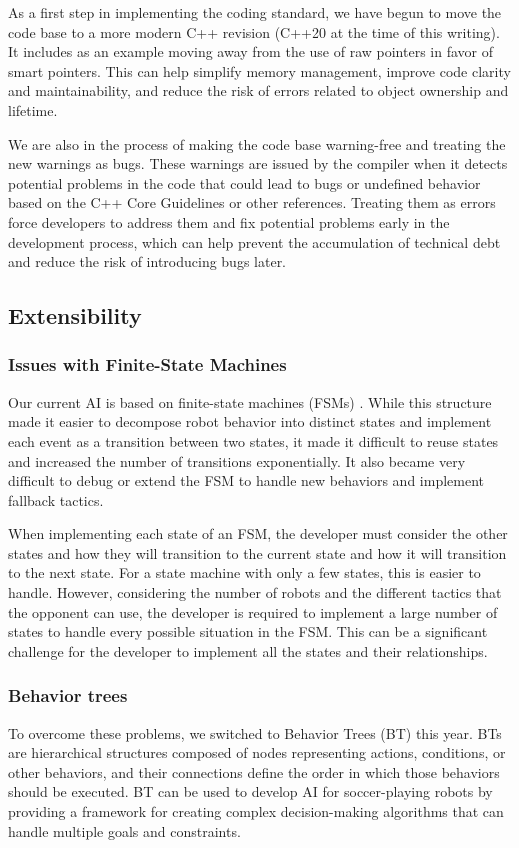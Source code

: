 \documentclass[runningheads]{llncs}
\begin{document}
As a first step in implementing the coding standard, we have begun to move the code base to a more modern C++ revision (C++20 at the time of this writing). It includes as an example moving away from the use of raw pointers in favor of smart pointers. This can help simplify memory management, improve code clarity and maintainability, and reduce the risk of errors related to object ownership and lifetime.

We are also in the process of making the code base warning-free and treating the new warnings as bugs. These warnings are issued by the compiler when it detects potential problems in the code that could lead to bugs or undefined behavior based on the C++ Core Guidelines \cite{ref_cppcoreguidelines} or other references. Treating them as errors force developers to address them and fix potential problems early in the development process, which can help prevent the accumulation of technical debt and reduce the risk of introducing bugs later.

\subsection{Extensibility}

\subsubsection{Issues with Finite-State Machines}
Our current AI is based on finite-state machines (FSMs) \cite{ref_ETDP2020}. While this structure made it easier to decompose robot behavior into distinct states and implement each event as a transition between two states, it made it difficult to reuse states and increased the number of transitions exponentially. It also became very difficult to debug or extend the FSM to handle new behaviors and implement fallback tactics.

When implementing each state of an FSM, the developer must consider the other states and how they will transition to the current state and how it will transition to the next state. For a state machine with only a few states, this is easier to handle. However, considering the number of robots and the different tactics that the opponent can use, the developer is required to implement a large number of states to handle every possible situation in the FSM. This can be a significant challenge for the developer to implement all the states and their relationships.

\subsubsection{Behavior trees}
To overcome these problems, we switched to Behavior Trees (BT) this year. BTs are hierarchical structures composed of nodes representing actions, conditions, or other behaviors, and their connections define the order in which those behaviors should be executed. BT can be used to develop AI for soccer-playing robots by providing a framework for creating complex decision-making algorithms that can handle multiple goals and constraints.
\end{document}
